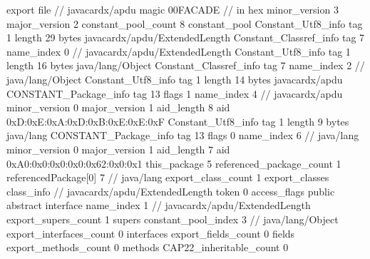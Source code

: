 export file {		// javacardx/apdu
	magic	00FACADE		 // in hex
	minor_version	3
	major_version	2
	constant_pool_count	8
	constant_pool {
		Constant_Utf8_info {
			tag	1
			length	29
			bytes	javacardx/apdu/ExtendedLength
		}
		Constant_Classref_info {
			tag	7
			name_index	0		// javacardx/apdu/ExtendedLength
		}
		Constant_Utf8_info {
			tag	1
			length	16
			bytes	java/lang/Object
		}
		Constant_Classref_info {
			tag	7
			name_index	2		// java/lang/Object
		}
		Constant_Utf8_info {
			tag	1
			length	14
			bytes	javacardx/apdu
		}
		CONSTANT_Package_info {
			tag	13
			flags	1
			name_index	4		// javacardx/apdu
			minor_version	0
			major_version	1
			aid_length	8
			aid	0xD:0xE:0xA:0xD:0xB:0xE:0xE:0xF
		}
		Constant_Utf8_info {
			tag	1
			length	9
			bytes	java/lang
		}
		CONSTANT_Package_info {
			tag	13
			flags	0
			name_index	6		// java/lang
			minor_version	0
			major_version	1
			aid_length	7
			aid	0xA0:0x0:0x0:0x0:0x62:0x0:0x1
		}
	}
	this_package	5
	referenced_package_count	1
	referencedPackage[0]	7		// java/lang
	export_class_count	1
	export_classes {
		class_info {		// javacardx/apdu/ExtendedLength
			token	0
			access_flags	public abstract interface
			name_index	1		// javacardx/apdu/ExtendedLength
			export_supers_count	1
			supers {
				constant_pool_index	3		// java/lang/Object
			}
			export_interfaces_count	0
			interfaces {
			}
			export_fields_count	0
			fields {
			}
			export_methods_count	0
			methods {
			}
			CAP22_inheritable_count	0
		}
	}
}
